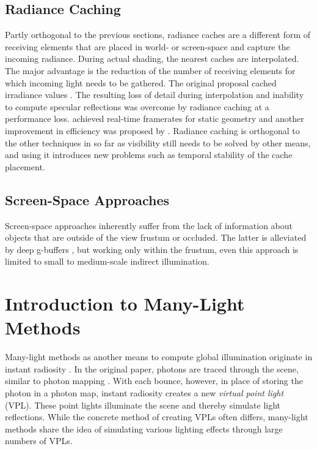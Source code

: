 \subsection{Radiance Caching}

Partly orthogonal to the previous sections, radiance caches are a different form of receiving elements that are placed in world- or screen-space and capture the incoming radiance. During actual shading, the nearest caches are interpolated. The major advantage is the reduction of the number of receiving elements for which incoming light needs to be gathered.
The original proposal cached irradiance values \citep{Ward:1988:IrradianceCaching}. The resulting loss of detail during interpolation and inability to compute specular reflections was overcome by radiance caching \citep{Krivanek:2005:RadianceCaching} at a performance loss. \citet{Scherzer:2012:PreconvolvedRadianceCaching} achieved real-time framerates for static geometry and another improvement in efficiency was proposed by \citet{Rehfeld:2014:ClusteredPreconvolvedRadianceCaching}.
Radiance caching is orthogonal to the other techniques in so far as visibility still needs to be solved by other means, and using it introduces new problems such as temporal stability of the cache placement.


\subsection{Screen-Space Approaches}

Screen-space approaches inherently suffer from the lack of information about objects that are outside of the view frustum or occluded. The latter is alleviated by deep g-buffers \citep{Mara:2014:DeepGBuffers, Mara:2016:DeepGBuffers2}, but working only within the frustum, even this approach is limited to small to medium-scale indirect illumination.



\section{Introduction to Many-Light Methods}


Many-light methods as another means to compute global illumination originate in instant radiosity \citep{Keller:1997:InstantRadiosity}. In the original paper, photons are traced through the scene, similar to photon mapping \citep{Jensen:1996:PhotonMapping}. With each bounce, however, in place of storing the photon in a photon map, instant radiosity creates a new \emph{virtual point light} (VPL). These point lights illuminate the scene and thereby simulate light reflections. While the concrete method of creating VPLs often differs, many-light methods share the idea of simulating various lighting effects through large numbers of VPLs.

